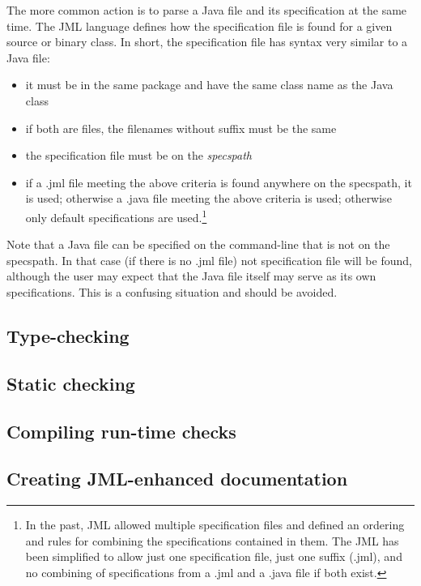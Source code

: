 \documentclass{report}%
\begin{document}
The more common action is to parse a Java file and its specification at the same time. The JML language defines how the specification file is found for a given source or binary class. In short, the specification file has syntax very similar to 
a Java file:
\begin{itemize}
\item it must be in the same package and have the same class name as the Java class
\item if both are files, the filenames without suffix must be the same
\item the specification file must be on the {\em specspath}
\item if a .jml file meeting the above criteria is found anywhere on the specspath, it is used; otherwise a .java file meeting
the above criteria is used; otherwise only default specifications are used.\footnote{In the past, JML allowed multiple specification files and defined an ordering and rules for combining the specifications contained in them. The JML has been 
simplified to allow just one specification file, just one suffix (.jml), and no combining of specifications from a .jml and a .java file if both exist.}
\end{itemize}
Note that a Java file can be specified on the command-line that is not on the specspath. In that case (if there is no .jml file) 
not specification file will be found, although the user may expect that the Java file itself may serve as its own specifications.
This is a confusing situation and should be avoided.


\subsection{Type-checking}

\subsection{Static checking}

\subsection{Compiling run-time checks}

\subsection{Creating JML-enhanced documentation}
\end{document}
